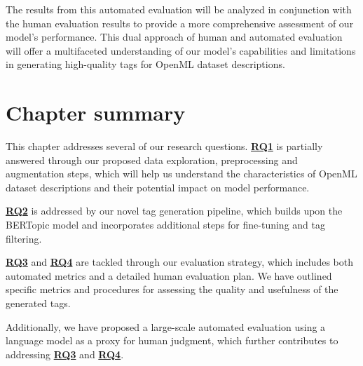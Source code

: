 The results from this automated evaluation will be analyzed in conjunction with the human evaluation results to provide a more comprehensive assessment of our model's performance. This dual approach of human and automated evaluation will offer a multifaceted understanding of our model's capabilities and limitations in generating high-quality tags for OpenML dataset descriptions.

\section{Chapter summary}
This chapter addresses several of our research questions. \hyperref[rq1]{\textbf{RQ1}} is partially answered through our proposed data exploration, preprocessing and augmentation steps, which will help us understand the characteristics of OpenML dataset descriptions and their potential impact on model performance.

\hyperref[rq2]{\textbf{RQ2}} is addressed by our novel tag generation pipeline, which builds upon the BERTopic model and incorporates additional steps for fine-tuning and tag filtering.

\hyperref[rq3]{\textbf{RQ3}} and \hyperref[rq4]{\textbf{RQ4}} are tackled through our evaluation strategy, which includes both automated metrics and a detailed human evaluation plan. We have outlined specific metrics and procedures for assessing the quality and usefulness of the generated tags.

Additionally, we have proposed a large-scale automated evaluation using a language model as a proxy for human judgment, which further contributes to addressing \hyperref[rq3]{\textbf{RQ3}} and \hyperref[rq4]{\textbf{RQ4}}.